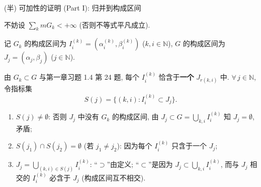 
\begin{frame}{(半) 可加性的证明 (Part I): 归并到构成区间}

不妨设 $\sum_k m G_k < +\infty$ (否则不等式平凡成立).

记 $G_k$ 的构成区间为
$I_i^{(k)} = (\alpha_i^{(k)}, \beta_i^{(k)})$ ($k, i \in \mathbb{N}$), $G$ 的构成区间为 $J_j = (\alpha_j, \beta_j)$ ($j \in \mathbb{N}$).

\pause

由 $G_k \subset G$ 与第一章习题 1.4 第 24 题, 每个 $I_i^{(k)}$ 恰含于\textbf{一个} $J_{r(k,i)}$ 中.
$\forall\, j \in \mathbb{N}$, 令指标集
\[
S(j) = \big\{(k, i) : I_i^{(k)} \subset J_j\big\}.
\]

\pause

\begin{enumerate}
\item $S(j) \neq \emptyset$: 否则 $J_j$ 中没有 $G_k$ 的构成区间, 由 $J_j \subset G = \bigcup_{k,i} I_i^{(k)}$ 知 $J_j = \emptyset$, 矛盾;
\item $S(j_1) \cap S(j_2) = \emptyset$ (若 $j_1 \neq j_2$): 因为每个 $I_i^{(k)}$ 只含于一个 $J_j$;
\item $J_j = \bigcup_{(k,i) \in S(j)} I_i^{(k)}$: ``$\supset$''由定义; ``$\subset$''是因为 $J_j \subset \bigcup_{k,i} I_i^{(k)}$, 而与 $J_j$ 相交的 $I_i^{(k)}$ 必含于 $J_j$ (构成区间互不相交).
\end{enumerate}

\end{frame}


